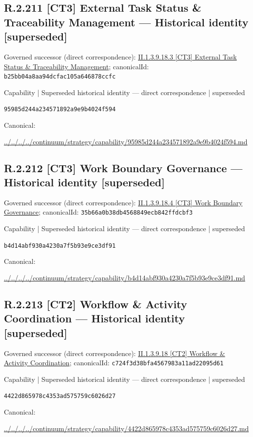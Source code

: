 \documentclass[10pt,a4paper]{article}
\begin{document}
\subsection*{R.2.211 [CT3] External Task Status \& Traceability Management — Historical identity [superseded]}
Governed successor (direct correspondence): \hyperref[element-b25bb04a8aa94dcfac105a646878ccfc]{II.1.3.9.18.3 [CT3] External Task Status \& Traceability Management}; canonicalId: \texttt{b25bb04a8aa94dcfac105a646878ccfc}\par
\label{element-95985d244a234571892a9e9b4024f594}
{\small Capability | Superseded historical identity — direct correspondence | superseded}\par
\texttt{95985d244a234571892a9e9b4024f594}\par
Canonical: \par
{\footnotesize\url{../../../../continuum/strategy/capability/95985d244a234571892a9e9b4024f594.md}}\par
\subsection*{R.2.212 [CT3] Work Boundary Governance — Historical identity [superseded]}
Governed successor (direct correspondence): \hyperref[element-35b66a0b38db4568849ecb842ffdcbf3]{II.1.3.9.18.4 [CT3] Work Boundary Governance}; canonicalId: \texttt{35b66a0b38db4568849ecb842ffdcbf3}\par
\label{element-b4d14abf930a4230a7f5b93e9ce3df91}
{\small Capability | Superseded historical identity — direct correspondence | superseded}\par
\texttt{b4d14abf930a4230a7f5b93e9ce3df91}\par
Canonical: \par
{\footnotesize\url{../../../../continuum/strategy/capability/b4d14abf930a4230a7f5b93e9ce3df91.md}}\par
\subsection*{R.2.213 [CT2] Workflow \& Activity Coordination — Historical identity [superseded]}
Governed successor (direct correspondence): \hyperref[element-c724f3d38bfa4567983a11ad22095d61]{II.1.3.9.18 [CT2] Workflow \& Activity Coordination}; canonicalId: \texttt{c724f3d38bfa4567983a11ad22095d61}\par
\label{element-4422d865978c4353ad575759c6026d27}
{\small Capability | Superseded historical identity — direct correspondence | superseded}\par
\texttt{4422d865978c4353ad575759c6026d27}\par
Canonical: \par
{\footnotesize\url{../../../../continuum/strategy/capability/4422d865978c4353ad575759c6026d27.md}}\par
\end{document}
